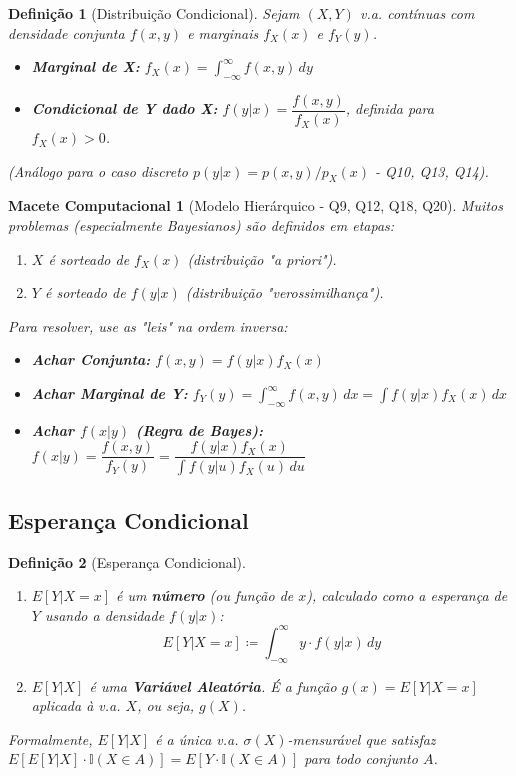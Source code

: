 \documentclass[12pt, a4paper]{article}
\newtheorem{defi}{Definição}
\newtheorem{macete}{Macete Computacional}
\begin{document}
\begin{defi}[Distribuição Condicional]
Sejam $(X,Y)$ v.a. contínuas com densidade conjunta $f(x,y)$ e marginais $f_X(x)$ e $f_Y(y)$.
\begin{itemize}
    \item \textbf{Marginal de X:} $f_X(x) = \int_{-\infty}^{\infty} f(x,y) \,dy$
    \item \textbf{Condicional de Y dado X:} $f(y|x) = \dfrac{f(x,y)}{f_X(x)}$, definida para $f_X(x) > 0$.
\end{itemize}
(Análogo para o caso discreto $p(y|x) = p(x,y)/p_X(x)$ - Q10, Q13, Q14).
\end{defi}

\begin{macete}[Modelo Hierárquico - Q9, Q12, Q18, Q20]
Muitos problemas (especialmente Bayesianos) são definidos em etapas:
\begin{enumerate}
    \item $X$ é sorteado de $f_X(x)$ (distribuição "a priori").
    \item $Y$ é sorteado de $f(y|x)$ (distribuição "verossimilhança").
\end{enumerate}
Para resolver, use as "leis" na ordem inversa:
\begin{itemize}
    \item \textbf{Achar Conjunta:} $f(x,y) = f(y|x) f_X(x)$
    \item \textbf{Achar Marginal de Y:} $f_Y(y) = \int_{-\infty}^{\infty} f(x,y) \,dx = \int f(y|x) f_X(x) \,dx$
    \item \textbf{Achar $f(x|y)$ (Regra de Bayes):} $f(x|y) = \dfrac{f(x,y)}{f_Y(y)} = \dfrac{f(y|x) f_X(x)}{\int f(y|u) f_X(u) \,du}$
\end{itemize}
\end{macete}

\subsection{Esperança Condicional}

\begin{defi}[Esperança Condicional]
\begin{enumerate}
    \item $E[Y|X=x]$ é um \textbf{número} (ou função de $x$), calculado como a esperança de $Y$ usando a densidade $f(y|x)$:
    $$ E[Y|X=x] \coloneqq \int_{-\infty}^{\infty} y \cdot f(y|x) \,dy $$
    \item $E[Y|X]$ é uma \textbf{Variável Aleatória}. É a função $g(x) = E[Y|X=x]$ aplicada à v.a. $X$, ou seja, $g(X)$.
\end{enumerate}
Formalmente, $E[Y|X]$ é a única v.a. $\sigma(X)$-mensurável que satisfaz $E[E[Y|X] \cdot \mathbb{I}(X \in A)] = E[Y \cdot \mathbb{I}(X \in A)]$ para todo conjunto $A$.
\end{defi}
\end{document}
